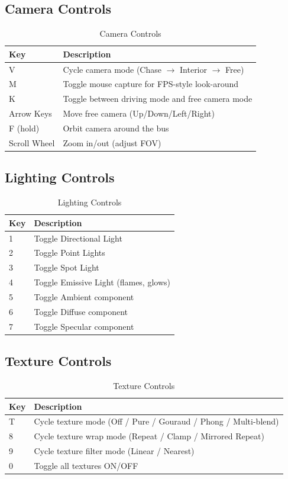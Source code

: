 \documentclass[12pt,a4paper]{article}
\begin{document}
\subsection{Camera Controls}

\begin{table}[H]
\centering
\begin{tabular}{ll}
\toprule
\textbf{Key} & \textbf{Description} \\
\midrule
V & Cycle camera mode (Chase $\rightarrow$ Interior $\rightarrow$ Free) \\
M & Toggle mouse capture for FPS-style look-around \\
K & Toggle between driving mode and free camera mode \\
Arrow Keys & Move free camera (Up/Down/Left/Right) \\
F (hold) & Orbit camera around the bus \\
Scroll Wheel & Zoom in/out (adjust FOV) \\
\bottomrule
\end{tabular}
\caption{Camera Controls}
\end{table}

\subsection{Lighting Controls}

\begin{table}[H]
\centering
\begin{tabular}{ll}
\toprule
\textbf{Key} & \textbf{Description} \\
\midrule
1 & Toggle Directional Light \\
2 & Toggle Point Lights \\
3 & Toggle Spot Light \\
4 & Toggle Emissive Light (flames, glows) \\
5 & Toggle Ambient component \\
6 & Toggle Diffuse component \\
7 & Toggle Specular component \\
\bottomrule
\end{tabular}
\caption{Lighting Controls}
\end{table}

\subsection{Texture Controls}

\begin{table}[H]
\centering
\begin{tabular}{ll}
\toprule
\textbf{Key} & \textbf{Description} \\
\midrule
T & Cycle texture mode (Off / Pure / Gouraud / Phong / Multi-blend) \\
8 & Cycle texture wrap mode (Repeat / Clamp / Mirrored Repeat) \\
9 & Cycle texture filter mode (Linear / Nearest) \\
0 & Toggle all textures ON/OFF \\
\bottomrule
\end{tabular}
\caption{Texture Controls}
\end{table}
\end{document}
